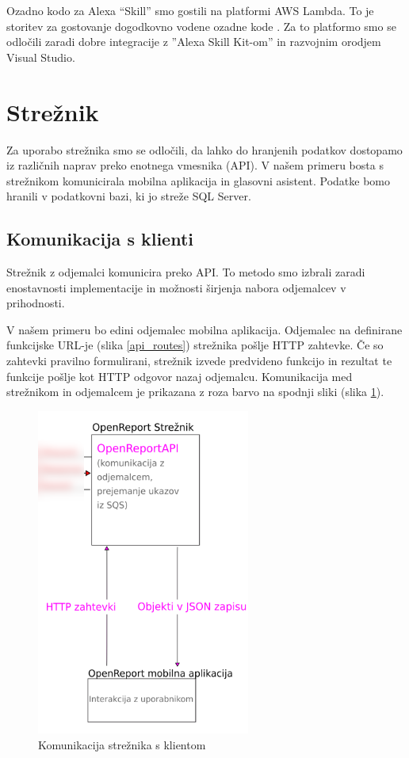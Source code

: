 \documentclass[a4paper, 12pt]{book}
\begin{document}
Ozadno kodo za Alexa \enquote{Skill} smo gostili na platformi AWS Lambda.
To je storitev za gostovanje dogodkovno vodene ozadne kode \cite{lambda}.
Za to platformo smo se odločili zaradi dobre integracije z ''Alexa Skill Kit-om'' in razvojnim orodjem Visual Studio.

\section{Strežnik}

Za uporabo strežnika smo se odločili, da lahko do hranjenih podatkov dostopamo iz različnih naprav preko enotnega vmesnika (API).
V našem primeru bosta s strežnikom komunicirala mobilna aplikacija in glasovni asistent.
Podatke bomo hranili v podatkovni bazi, ki jo streže SQL Server.

\subsection{Komunikacija s klienti}

Strežnik z odjemalci komunicira preko API.
To metodo smo izbrali zaradi enostavnosti implementacije in možnosti širjenja nabora odjemalcev v prihodnosti.

V našem primeru bo edini odjemalec mobilna aplikacija.
Odjemalec na definirane funkcijske URL-je (slika \ref{api_routes}) strežnika pošlje HTTP zahtevke.
Če so zahtevki pravilno formulirani, strežnik izvede predvideno funkcijo in rezultat te funkcije pošlje kot HTTP odgovor nazaj odjemalcu.
Komunikacija med strežnikom in odjemalcem je prikazana z roza barvo na spodnji sliki (slika \ref{plan_server_client}).

\begin{figure}[H]
\begin{center}
\includegraphics[width=7cm]{plan_server_client}
\end{center}
\caption{Komunikacija strežnika s klientom}
\label{plan_server_client}
\end{figure}
\end{document}
